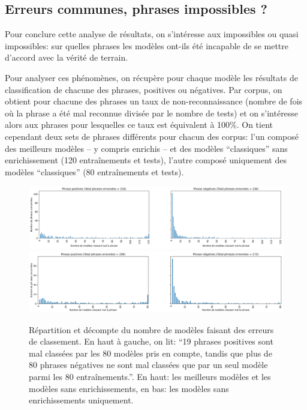 \subsection{Erreurs communes, phrases impossibles ?}

Pour conclure cette analyse de résultats, on s'intéresse aux impossibles ou quasi impossibles: sur quelles phrases les modèles ont-ils été incapable de se mettre d'accord avec la vérité de terrain. 

Pour analyser ces phénomènes, on récupère pour chaque modèle les résultats de classification de chacune des phrases, positives ou négatives. Par corpus, on obtient pour chacune des phrases un taux de non-reconnaissance (nombre de fois où la phrase a été mal reconnue divisée par le nombre de tests) et on s'intéresse alors aux phrases pour lesquelles ce taux est équivalent à 100\%. On tient cependant deux sets de phrases différents pour chacun des corpus: l'un composé des meilleurs modèles -- y compris enrichis -- et des modèles \enquote{classiques} sans enrichissement (120 entraînements et tests), l'autre composé uniquement des modèles \enquote{classiques} (80 entraînements et tests).

\begin{figure}[ht]
    \centering
    \includegraphics[width=\linewidth]{figures/chap4/commonErrors.png}
    \includegraphics[width=\linewidth]{figures/chap4/commonErrorsNotEnriched.png}
    \caption{Répartition et décompte du nombre de modèles faisant des erreurs de classement. En haut à gauche, on lit: \enquote{19 phrases positives sont mal classées par les 80 modèles pris en compte, tandis que plus de 80 phrases négatives ne sont mal classées que par un seul modèle parmi les 80 entraînements.}. En haut: les meilleurs modèles et les modèles sans enrichissements, en bas: les modèles sans enrichissements uniquement.}
    \label{fig:chap4:commonErrors}
\end{figure}

